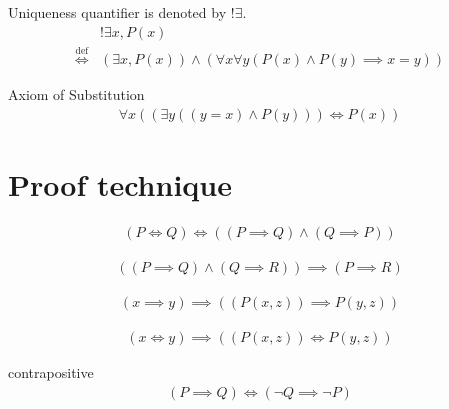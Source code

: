\begin{defn}
\label{Definition:uniqueness_quantifier}
Uniqueness quantifier is denoted by $!\exists$.
\begin{align*}
& !\exists x, P(x) \\
\overset{\operatorname{def}}{\iff} & (\exists x, P(x)) \land (\forall x \forall y (P(x) \land P(y) \implies x = y))
\end{align*}
\end{defn}

\begin{axm}
\label{Axiom:axiom_of_substitution}
Axiom of Substitution
\begin{align*}
\forall x( (\exists y((y = x) \land P(y))) \iff P(x) )
\end{align*}
\end{axm}

\section{Proof technique}
\begin{prop}
\begin{align*}
(P \iff Q) \iff ((P \implies Q) \land (Q \implies P))
\end{align*}
\end{prop}

\begin{prop}
\begin{align*}
((P \implies Q) \land (Q \implies R)) \implies (P \implies R)
\end{align*}
\end{prop}

\begin{prop}
\label{Proposition:lor_implies_lor}
\begin{align*}
(x \implies y) \implies ((P(x,z)) \implies P(y,z))
\end{align*}
\end{prop}

\begin{prop}
\label{Proposition:lor_iff_lor}
\begin{align*}
(x \iff y) \implies ((P(x,z)) \iff P(y,z))
\end{align*}
\end{prop}

\begin{prop}
\label{Proposition:contrapositive}
contrapositive
\begin{align*}
(P \implies Q) \iff (\lnot Q \implies \lnot P)
\end{align*}
\end{prop}

